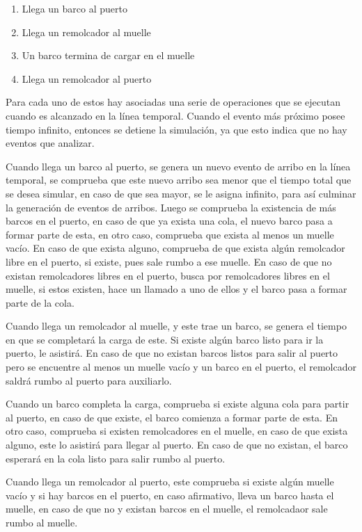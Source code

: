 \documentclass[titlepage,11pt]{scrartcl}
\begin{document}
	\begin{enumerate}
		\item Llega un barco al puerto
		\item Llega un remolcador al muelle
		\item Un barco termina de cargar en el muelle
		\item Llega un remolcador al puerto
	\end{enumerate}

	Para cada uno de estos hay asociadas una serie de operaciones que se ejecutan cuando es alcanzado en la línea temporal. Cuando el evento más próximo posee tiempo infinito, entonces se detiene la simulación, ya que esto indica que no hay eventos que analizar. 
	
	Cuando llega un barco al puerto, se genera un nuevo evento de arribo en la línea temporal, se comprueba que este nuevo arribo sea menor que el tiempo total que se desea simular, en caso de que sea mayor, se le asigna infinito, para así culminar la generación de eventos de arribos. Luego se comprueba la existencia de más barcos en el puerto, en caso de que ya exista una cola, el nuevo barco pasa a formar parte de esta, en otro caso, comprueba que exista al menos un muelle vacío. En caso de que exista alguno, comprueba de que exista algún remolcador libre en el puerto, si existe, pues sale rumbo a ese muelle. En caso de que no existan remolcadores libres en el puerto, busca por remolcadores libres en el muelle, si estos existen, hace un llamado a uno de ellos y el barco pasa a formar parte de la cola.

	Cuando llega un remolcador al muelle, y este trae un barco, se genera el tiempo en que se completará la carga de este. Si existe algún barco listo para ir la puerto, le asistirá. En caso de que no existan barcos listos para salir al puerto pero se encuentre al menos un muelle vacío y un barco en el puerto, el remolcador saldrá rumbo al puerto para auxiliarlo.

	Cuando un barco completa la carga, comprueba si existe alguna cola para partir al puerto, en caso de que existe, el barco comienza a formar parte de esta. En otro caso, comprueba si existen remolcadores en el muelle, en caso de que exista alguno, este lo asistirá para llegar al puerto. En caso de que no existan, el barco esperará en la cola listo para salir rumbo al puerto.

	Cuando llega un remolcador al puerto, este comprueba si existe algún muelle vacío y si hay barcos en el puerto, en caso afirmativo, lleva un barco hasta el muelle, en caso de que no y existan barcos en el muelle, el remolcadaor sale rumbo al muelle.
\end{document}
